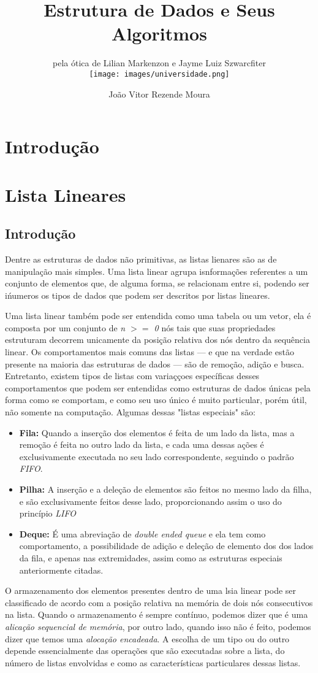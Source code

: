 \documentclass[12pt, a4paper]{paper}
\title{Estrutura de Dados e Seus Algoritmos}
\subtitle{pela ótica de Lilian Markenzon e Jayme Luiz Szwarcfiter\\
  \hfill\texttt{[image: images/universidade.png]}
  \vspace{-2cm}
}
\author{João Vitor Rezende Moura}
\begin{document}
\section{Introdução} %
\label{sec:Introdução}

\section{Lista Lineares} %
\label{sec:Lista Lineares}
  \subsection{Introdução} %
  \label{sub:Introdução}
  Dentre as estruturas de dados não primitivas, as listas lienares são as de manipulação mais simples. Uma lista linear agrupa isnformações referentes a um conjunto de elementos que, de alguma forma, se relacionam entre si, podendo ser ińumeros os tipos de dados que podem ser descritos por listas lineares.\par
  Uma lista linear também pode ser entendida como uma tabela ou um vetor, ela é composta por um conjunto de \textit{n $>=$ 0} nós tais que suas propriedades estruturam decorrem unicamente da posição relativa dos nós dentro da sequência linear. Os comportamentos mais comuns das listas --- e que na verdade estão presente na maioria das estruturas de dados --- são de remoção, adição e busca. Entretanto, existem tipos de listas com variaççoes específicas desses comportamentos que podem ser entendidas como estruturas de dados únicas pela forma como se comportam, e como seu uso único é muito particular, porém útil, não somente na computação. Algumas dessas "listas especiais" são:
\begin{itemize}
  \item \textbf{Fila:} Quando a inserção dos elementos é feita de um lado da lista, mas a remoção é feita no outro lado da lista, e cada uma dessas ações é exclusivamente executada no seu lado correspondente, seguindo o padrão \textit{FIFO}.
  \item \textbf{Pilha:} A inserção e a deleção de elementos são feitos no mesmo lado da filha, e são exclusivamente feitos desse lado, proporcionando assim o uso do princípio \textit{LIFO}
  \item \textbf{Deque:} É uma abreviação de \textit{double ended queue} e ela tem como comportamento, a possibilidade de adição e deleção de elemento dos dos lados da fila, e apenas nas extremidades, assim como as estruturas especiais anteriormente citadas. 
\end{itemize}
  O armazenamento dos elementos presentes dentro de uma lsia linear pode ser classificado de acordo com a posição relativa na memória de dois nós consecutivos na lista. Quando o armazenamento é sempre contínuo, podemos dizer que é uma \textit{alicação sequencial de memória}, por outro lado, quando isso não é feito, podemos dizer que temos uma \textit{alocação encadeada}. A escolha de um tipo ou do outro depende essencialmente das operações que são executadas sobre a lista, do número de listas envolvidas e como as características particulares dessas listas.
\end{document}
